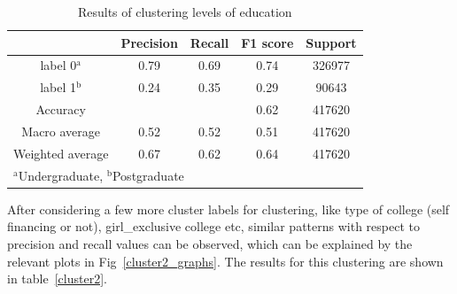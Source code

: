 \begin{table}[htbp]
    \caption{Results of clustering levels of education}
    \label{cluster1}
    \begin{center}
    \begin{tabular}{|c|c|c|c|c|}
    \hline
     
     & \textbf{Precision}& \textbf{Recall}& \textbf{F1 score} & \textbf{Support}  \\
    \hline
    
    label 0$^{\mathrm{a}}$ & 0.79 & 0.69 & 0.74 & 326977 \\\hline
    label 1$^{\mathrm{b}}$ & 0.24 & 0.35 & 0.29 & 90643 \\\hline
    Accuracy &  &  & 0.62 & 417620 \\\hline
    Macro average & 0.52 & 0.52 & 0.51 & 417620 \\\hline
    Weighted average & 0.67 & 0.62 & 0.64 & 417620 \\

    \hline

    \multicolumn{4}{l}{$^{\mathrm{a}}$Undergraduate, $^{\mathrm{b}}$Postgraduate}
    \end{tabular}
    \end{center}
\end{table}


After considering a few more cluster labels for clustering, like type of college (self financing or not), girl\_exclusive college etc, similar patterns with respect to precision and recall values can be observed, which can be explained by the relevant plots in Fig~\ref{cluster2_graphs}. The results for this clustering are shown in table~\ref{cluster2}.


